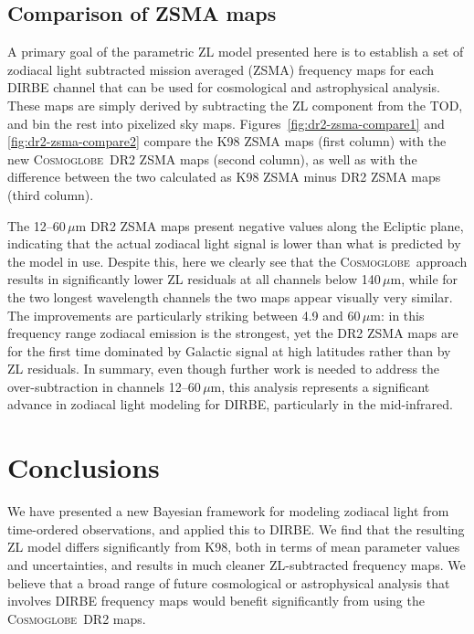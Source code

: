 \documentclass[twocolumn]{aa}
\newcommand{\cosmoglobe}{\textsc{Cosmoglobe}}
\begin{document}
\subsection{Comparison of ZSMA maps}

A primary goal of the parametric ZL model presented here is to
establish a set of zodiacal light subtracted mission averaged (ZSMA)
frequency maps for each DIRBE channel that can be used for
cosmological and astrophysical analysis. These maps are simply derived
by subtracting the ZL component from the TOD, and bin the rest
into pixelized sky maps. Figures~\ref{fig:dr2-zsma-compare1} and \ref{fig:dr2-zsma-compare2}
compare the K98 ZSMA maps (first column) with the new
\cosmoglobe\ DR2 ZSMA maps (second column), as well as with the
difference between the two calculated as K98 ZSMA minus DR2 ZSMA maps (third column).

The 12--60\,$\mu$m DR2 ZSMA maps present negative 
values along the Ecliptic plane, indicating that the actual zodiacal light signal is lower than 
what is predicted by the model in use. Despite this, here we clearly
see that the \cosmoglobe\ approach results in significantly lower ZL residuals at
all channels below 140\,$\mu$m, while for the two longest wavelength
channels the two maps appear visually very similar. The improvements
are particularly striking between 4.9 and 60$\,\mu$m: in this frequency range zodiacal
emission is the strongest, yet the DR2 ZSMA maps are for the first time dominated by Galactic
signal at high latitudes rather than by ZL residuals. In summary, even though further work is needed 
to address the over-subtraction in channels 12--60\,$\mu$m, this analysis represents a 
significant advance in zodiacal light modeling for DIRBE, particularly in the mid-infrared.








\section{Conclusions}
\label{sec:conclusions}

We have presented a new Bayesian framework for modeling zodiacal
light from time-ordered observations, and applied this to 
DIRBE. We find that the resulting ZL model differs
significantly from K98, both in terms of mean parameter
values and uncertainties, and results in much cleaner
ZL-subtracted frequency maps. We believe that a broad range of future
cosmological or astrophysical analysis that involves DIRBE frequency
maps would benefit significantly from using the \cosmoglobe\ DR2 maps.
\end{document}
